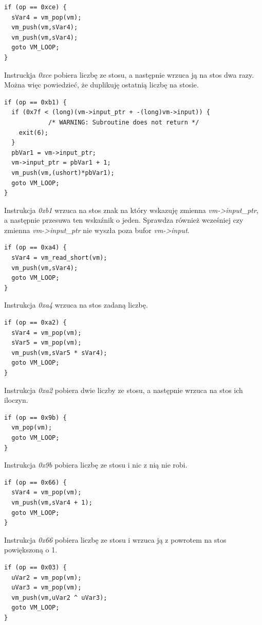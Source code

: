 \documentclass[language=polish,type=eng]{aghmodern}
\begin{document}
\begin{appendices}
\begin{verbatim}
if (op == 0xce) {
  sVar4 = vm_pop(vm);
  vm_push(vm,sVar4);
  vm_push(vm,sVar4);
  goto VM_LOOP;
}
\end{verbatim}

Instruckja \emph{0xce} pobiera liczbę ze stosu, a następnie wrzuca ją na stos dwa razy.
Można więc powiedzieć, że duplikuję ostatnią liczbę na stosie.

\begin{verbatim}
if (op == 0xb1) {
  if (0x7f < (long)(vm->input_ptr + -(long)vm->input)) {
            /* WARNING: Subroutine does not return */
    exit(6);
  }
  pbVar1 = vm->input_ptr;
  vm->input_ptr = pbVar1 + 1;
  vm_push(vm,(ushort)*pbVar1);
  goto VM_LOOP;
}
\end{verbatim}

Instrukcja \emph{0xb1} wrzuca na stos znak na który wskazuję zmienna \emph{vm->input\_ptr},
a następnie przesuwa ten wskaźnik o jeden. Sprawdza również wcześniej czy zmienna
\emph{vm->input\_ptr} nie wyszła poza bufor \emph{vm->input}.

\begin{verbatim}
if (op == 0xa4) {
  sVar4 = vm_read_short(vm);
  vm_push(vm,sVar4);
  goto VM_LOOP;
}
\end{verbatim}

Instrukcja \emph{0xa4} wrzuca na stos zadaną liczbę.

\begin{verbatim}
if (op == 0xa2) {
  sVar4 = vm_pop(vm);
  sVar5 = vm_pop(vm);
  vm_push(vm,sVar5 * sVar4);
  goto VM_LOOP;
}
\end{verbatim}

Instrukcja \emph{0xa2} pobiera dwie liczby ze stosu, a następnie wrzuca na stos ich iloczyn.

\begin{verbatim}
if (op == 0x9b) {
  vm_pop(vm);
  goto VM_LOOP;
}
\end{verbatim}

Instrukcja \emph{0x9b} pobiera liczbę ze stosu i nic z nią nie robi.

\begin{verbatim}
if (op == 0x66) {
  sVar4 = vm_pop(vm);
  vm_push(vm,sVar4 + 1);
  goto VM_LOOP;
}
\end{verbatim}

Instrukcja \emph{0x66} pobiera liczbę ze stosu i wrzuca ją z powrotem na stos powiększoną o 1.

\begin{verbatim}
if (op == 0x03) {
  uVar2 = vm_pop(vm);
  uVar3 = vm_pop(vm);
  vm_push(vm,uVar2 ^ uVar3);
  goto VM_LOOP;
}
\end{verbatim}


\end{appendices}
\end{document}
